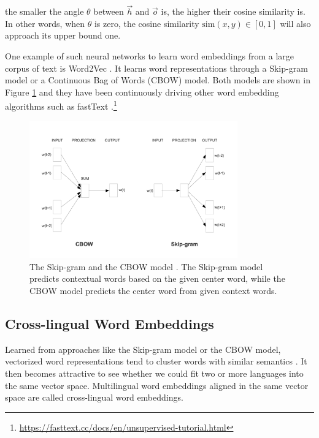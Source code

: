 \documentclass[thesis,fonts=libertine]{cluu}
\begin{document}
\noindent the smaller the angle $\theta$ between $\vec{h}$ and $\vec{o}$ is, the higher their cosine similarity is. In other words, when $\theta$ is zero, the cosine similarity $\text{sim}(x, y) \in [0, 1]$ will also approach its upper bound one.

One example of such neural networks to learn word embeddings from a large corpus of text is Word2Vec \parencite{Mikolov:2013aa,Mikolov:2013ab}. It learns word representations through a Skip-gram model or a Continuous Bag of Words (CBOW) model. Both models are shown in Figure \ref{fig:skip_gram_and_cbow} and they have been continuously driving other word embedding algorithms such as fastText \parencite{Joulin:2018aa}.\footnote{\url{https://fasttext.cc/docs/en/unsupervised-tutorial.html}}

\begin{figure}
  \centering
  \includegraphics[width=0.8\textwidth]{skip_gram_and_cbow_models.png}
  \caption{The Skip-gram and the CBOW model \parencite{Mikolov:2013ac}. The Skip-gram model predicts contextual words based on the given center word, while the CBOW model predicts the center word from given context words.}
  \label{fig:skip_gram_and_cbow}
\end{figure}

\subsection{Cross-lingual Word Embeddings}
\label{sec:multilingual_word_embeddings}

Learned from approaches like the Skip-gram model or the CBOW model, vectorized word representations tend to cluster words with similar semantics \parencite{Mikolov:2013ac}. It then becomes attractive to see whether we could fit two or more languages into the same vector space. Multilingual word embeddings aligned in the same vector space are called cross-lingual word embeddings.
\end{document}
